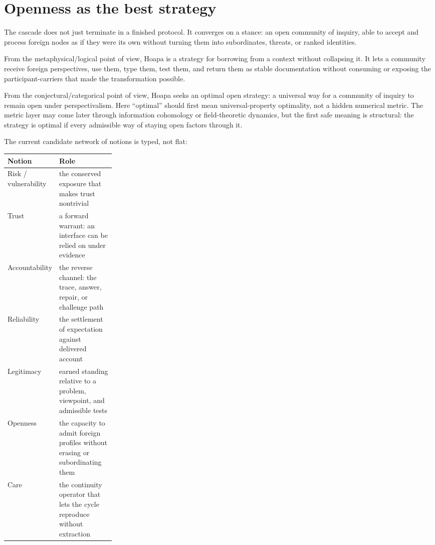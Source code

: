 \documentclass[11pt]{article}
\begin{document}
\section{Openness as the best strategy}

The cascade does not just terminate in a finished protocol. It converges on a
stance: an open community of inquiry, able to accept and process foreign nodes
as if they were its own without turning them into subordinates, threats, or
ranked identities.

From the metaphysical/logical point of view, Hoapa is a strategy for borrowing
from a context without collapsing it. It lets a community receive foreign
perspectives, use them, type them, test them, and return them as stable
documentation without consuming or exposing the participant-carriers that made
the transformation possible.

From the conjectural/categorical point of view, Hoapa seeks an optimal open
strategy: a universal way for a community of inquiry to remain open under
perspectivalism. Here ``optimal'' should first mean universal-property
optimality, not a hidden numerical metric. The metric layer may come later
through information cohomology or field-theoretic dynamics, but the first safe
meaning is structural: the strategy is optimal if every admissible way of
staying open factors through it.

The current candidate network of notions is typed, not flat:

\begin{table}[H]
\small
\setlength{\tabcolsep}{5pt}
\renewcommand{\arraystretch}{1.18}
\begin{tabularx}{\linewidth}{@{}p{0.25\linewidth}Y@{}}
\toprule
Notion & Role \\
\midrule
Risk / vulnerability & the conserved exposure that makes trust nontrivial \\
\addlinespace
Trust & a forward warrant: an interface can be relied on under evidence \\
\addlinespace
Accountability & the reverse channel: the trace, answer, repair, or challenge path \\
\addlinespace
Reliability & the settlement of expectation against delivered account \\
\addlinespace
Legitimacy & earned standing relative to a problem, viewpoint, and admissible tests \\
\addlinespace
Openness & the capacity to admit foreign profiles without erasing or subordinating them \\
\addlinespace
Care & the continuity operator that lets the cycle reproduce without extraction \\
\bottomrule
\end{tabularx}
\end{table}
\end{document}

